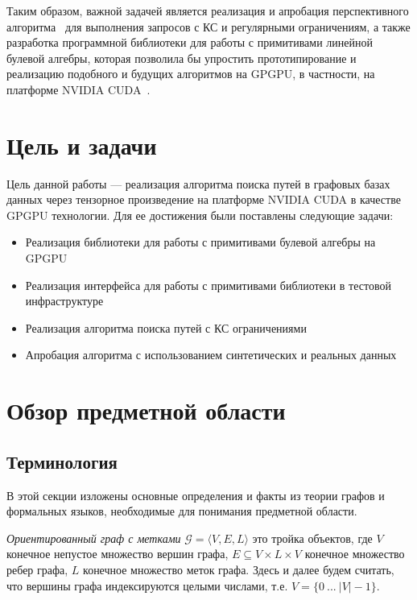 \documentclass[14pt]{matmex-diploma-custom}
\begin{document}
Таким образом, важной задачей является реализация и апробация перспективного алгоритма~\cite{inbook:kronecker_cfpq_adbis} для выполнения запросов с КС и регулярными ограничениям, а также разработка программной библиотеки для работы с примитивами линейной булевой алгебры, которая позволила бы упростить прототипирование и реализацию подобного и будущих алгоритмов на GPGPU, в частности, на платформе NVIDIA CUDA~\cite{net:cuda_toolkit_docs}.

\section{Цель и задачи}

Цель данной работы --- реализация алгоритма поиска путей в графовых базах данных через тензорное произведение на платформе NVIDIA CUDA в качестве GPGPU технологии. Для ее достижения были поставлены следующие задачи:

\begin{itemize}
    \item Реализация библиотеки для работы с примитивами булевой алгебры на GPGPU
    \item Реализация интерфейса для работы с примитивами библиотеки в тестовой инфраструктуре
    \item Реализация алгоритма поиска путей с КС ограничениями
    \item Апробация алгоритма с использованием синтетических и реальных данных
\end{itemize}

\section{Обзор предметной области}

\subsection{Терминология}

В этой секции изложены основные определения и факты из теории графов и формальных языков, необходимые для понимания предметной области. 
    
\textit{Ориентированный граф с метками} $\mathcal{G} = \langle V, E, L \rangle$ это тройка объектов, где $V$ конечное непустое множество вершин графа, $E \subseteq V \times L \times V$ конечное множество ребер графа, $L$ конечное множество меток графа. Здесь и далее будем считать, что вершины графа индексируются целыми числами, т.е. $V = \{0~...~|V| - 1\}$.
\end{document}
